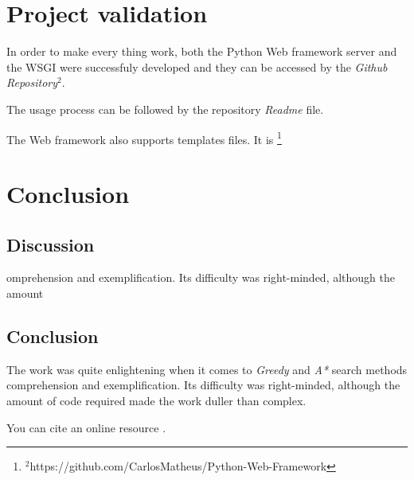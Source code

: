 \documentclass[journal,12pt,onecolumn,draftclsnofoot,]{IEEEtran}
\newcommand\blfootnote[1]{%
  \begingroup
  \renewcommand\thefootnote{}\footnote{#1}%
  \addtocounter{footnote}{-1}%
  \endgroup
}
\let\i\textit
\begin{document}
\section{Project validation}
In order to make every thing work, both the Python Web framework server and the WSGI were successfuly developed and they can be accessed by the \i{Github Repository}$^2$.

The usage process can be followed by the repository \i{Readme} file.

The Web framework also supports templates files. It is
\blfootnote{$^2$https://github.com/CarlosMatheus/Python-Web-Framework}

\section{Conclusion}

\subsection{Discussion}
 omprehension and exemplification. Its difficulty was right-minded, although the amount
\subsection{Conclusion}
The work was quite enlightening when it comes to \i{Greedy} and \i{A*} search methods comprehension and exemplification. Its difficulty was right-minded, although the amount of code required made the work duller than complex.




You can cite an online resource \cite{ford}.

\printbibliography


\vfill
\end{document}
